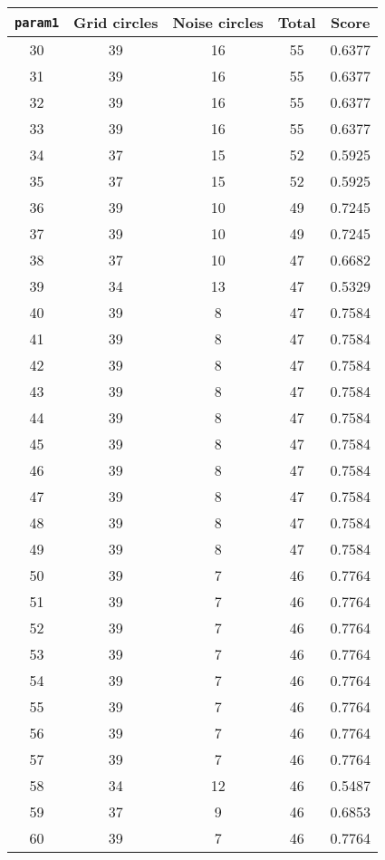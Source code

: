 \documentclass[letterpaper, 12pt]{article}
\begin{document}
\begin{longtable}{|c|c|c|c|c|}
\hline
\textbf{\texttt{param1}} & \textbf{Grid circles} & \textbf{Noise circles} & \textbf{Total} & \textbf{Score} \\
\hline
30 & 39 & 16 & 55 & 0.6377 \\
\hline
31 & 39 & 16 & 55 & 0.6377 \\
\hline
32 & 39 & 16 & 55 & 0.6377 \\
\hline
33 & 39 & 16 & 55 & 0.6377 \\
\hline
34 & 37 & 15 & 52 & 0.5925 \\
\hline
35 & 37 & 15 & 52 & 0.5925 \\
\hline
36 & 39 & 10 & 49 & 0.7245 \\
\hline
37 & 39 & 10 & 49 & 0.7245 \\
\hline
38 & 37 & 10 & 47 & 0.6682 \\
\hline
39 & 34 & 13 & 47 & 0.5329 \\
\hline
40 & 39 & 8 & 47 & 0.7584 \\
\hline
41 & 39 & 8 & 47 & 0.7584 \\
\hline
42 & 39 & 8 & 47 & 0.7584 \\
\hline
43 & 39 & 8 & 47 & 0.7584 \\
\hline
44 & 39 & 8 & 47 & 0.7584 \\
\hline
45 & 39 & 8 & 47 & 0.7584 \\
\hline
46 & 39 & 8 & 47 & 0.7584 \\
\hline
47 & 39 & 8 & 47 & 0.7584 \\
\hline
48 & 39 & 8 & 47 & 0.7584 \\
\hline
49 & 39 & 8 & 47 & 0.7584 \\
\hline
50 & 39 & 7 & 46 & 0.7764 \\
\hline
51 & 39 & 7 & 46 & 0.7764 \\
\hline
52 & 39 & 7 & 46 & 0.7764 \\
\hline
53 & 39 & 7 & 46 & 0.7764 \\
\hline
54 & 39 & 7 & 46 & 0.7764 \\
\hline
55 & 39 & 7 & 46 & 0.7764 \\
\hline
56 & 39 & 7 & 46 & 0.7764 \\
\hline
57 & 39 & 7 & 46 & 0.7764 \\
\hline
58 & 34 & 12 & 46 & 0.5487 \\
\hline
59 & 37 & 9 & 46 & 0.6853 \\
\hline
60 & 39 & 7 & 46 & 0.7764 \\
\hline

\end{longtable}
\end{document}
